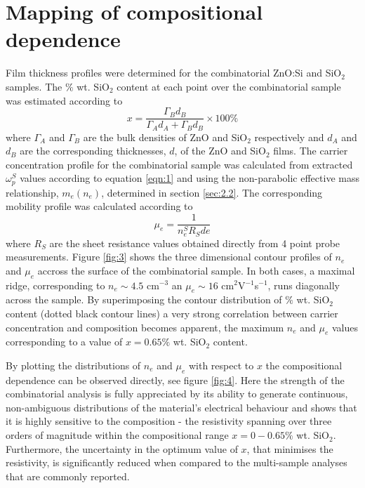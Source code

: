 \documentclass[aps,prl,preprint,showpacs,showkeys,linenumbers]{revtex4-1}
\begin{document}
\section{Mapping of compositional dependence}
\label{sec:2.3}

Film thickness profiles were determined for the combinatorial ZnO:Si and SiO$_{2}$ samples. The $\%$ wt. SiO$_{2}$ content at each point over the combinatorial sample was estimated according to
\begin{equation}
\label{eqn:8}
x = \frac{\Gamma_{B}d_{B}}{\Gamma_Ad_A+\Gamma_{B}d_{B}}\times100\%
\end{equation}
where $\Gamma_A$ and $\Gamma_B$ are the bulk densities of ZnO and SiO$_{2}$ respectively and $d_A$ and $d_B$ are the corresponding thicknesses, $d$, of the ZnO and SiO$_{2}$ films. The carrier concentration profile for the combinatorial sample was calculated from extracted $\omega_p^S$ values according to equation \ref{eqn:1} and using the non-parabolic effective mass relationship, $m_e(n_e)$, determined in section \ref{sec:2.2}. The corresponding mobility profile was calculated according to
\begin{equation}
\label{eqn:9}
\mu_e=\frac{1}{n_e^SR_Sde}
\end{equation}
where $R_S$ are the sheet resistance values obtained directly from 4 point probe measurements. Figure \ref{fig:3} shows the three dimensional contour profiles of $n_e$ and $\mu_e$ accross the surface of the combinatorial sample. In both cases, a maximal ridge, corresponding to $n_e\sim 4.5$ cm$^{-3}$ an $\mu_e \sim 16$ cm$^2$V$^{-1}$s$^{-1}$, runs diagonally across the sample. By superimposing the contour distribution of $\%$ wt. SiO$_{2}$ content (dotted black contour lines) a very strong correlation between carrier concentration and composition becomes apparent, the maximum $n_e$ and $\mu_e$ values corresponding to a value of $x=0.65\%$ wt. SiO$_{2}$ content.

By plotting the distributions of $n_e$ and $\mu_e$ with respect to $x$ the compositional dependence can be observed directly, see figure \ref{fig:4}. Here the strength of the combinatorial analysis is fully appreciated by its ability to generate continuous, non-ambiguous distributions of the material's electrical behaviour and shows that it is highly sensitive to the composition - the resistivity spanning over three orders of magnitude within the compositional range $x = 0 - 0.65\%$ wt. SiO$_{2}$. Furthermore, the uncertainty in the optimum value of $x$, that minimises the resistivity, is significantly reduced when compared to the multi-sample analyses that are commonly reported. 
\end{document}
